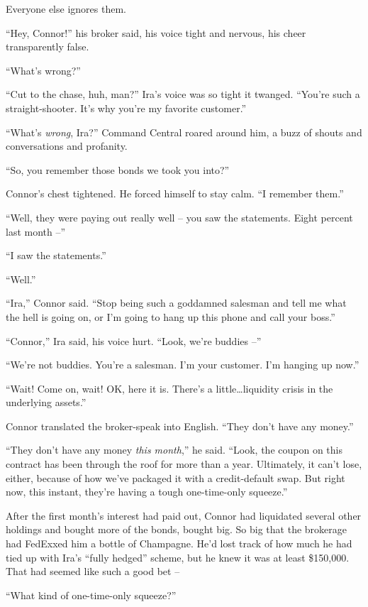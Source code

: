 Everyone else ignores them.

\tb

``Hey, Connor!'' his broker said, his voice tight and nervous, his
cheer transparently false.

``What's wrong?''

``Cut to the chase, huh, man?'' Ira's voice was so tight it twanged.
``You're such a straight-shooter. It's why you're my favorite
customer.''

``What's \emph{wrong}, Ira?'' Command Central roared around him, a
buzz of shouts and conversations and profanity.

``So, you remember those bonds we took you into?''

Connor's chest tightened. He forced himself to stay calm. ``I
remember them.''

``Well, they were paying out really well -- you saw the statements.
Eight percent last month --''

``I saw the statements.''

``Well.''

``Ira,'' Connor said. ``Stop being such a goddamned salesman and tell
me what the hell is going on, or I'm going to hang up this phone
and call your boss.''

``Connor,'' Ira said, his voice hurt. ``Look, we're buddies --''

``We're not buddies. You're a salesman. I'm your customer. I'm
hanging up now.''

``Wait! Come on, wait! OK, here it is. There's a little\ldots{}liquidity
crisis in the underlying assets.''

Connor translated the broker-speak into English. ``They don't have
any money.''

``They don't have any money \emph{this month},'' he said. ``Look, the
coupon on this contract has been through the roof for more than a
year. Ultimately, it can't lose, either, because of how we've
packaged it with a credit-default swap. But right now, this
instant, they're having a tough one-time-only squeeze.''

After the first month's interest had paid out, Connor had
liquidated several other holdings and bought more of the bonds,
bought big. So big that the brokerage had FedExxed him a bottle of
Champagne. He'd lost track of how much he had tied up with Ira's
``fully hedged'' scheme, but he knew it was at least \$150,000. That
had seemed like such a good bet --

``What kind of one-time-only squeeze?''

